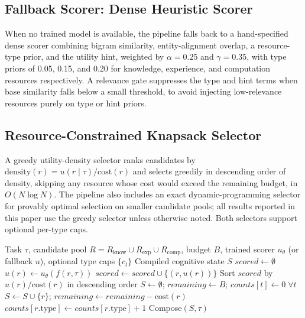 \documentclass{article}
\begin{document}
\subsection{Fallback Scorer: Dense Heuristic Scorer}

When no trained model is available, the pipeline falls back to a hand-specified dense scorer combining bigram similarity, entity-alignment overlap, a resource-type prior, and the utility hint, weighted by $\alpha = 0.25$ and $\gamma = 0.35$, with type priors of 0.05, 0.15, and 0.20 for knowledge, experience, and computation resources respectively. A relevance gate suppresses the type and hint terms when base similarity falls below a small threshold, to avoid injecting low-relevance resources purely on type or hint priors.

\subsection{Resource-Constrained Knapsack Selector}

A greedy utility-density selector ranks candidates by $\text{density}(r) = u(r \mid \tau) / \text{cost}(r)$ and selects greedily in descending order of density, skipping any resource whose cost would exceed the remaining budget, in $O(N \log N)$. The pipeline also includes an exact dynamic-programming selector for provably optimal selection on smaller candidate pools; all results reported in this paper use the greedy selector unless otherwise noted. Both selectors support optional per-type caps.

\begin{algorithm}[t]
\caption{Cognitive State Compilation}
\begin{algorithmic}[1]
\Require Task $\tau$, candidate pool $R = R_{\text{know}} \cup R_{\text{exp}} \cup R_{\text{comp}}$, budget $B$, trained scorer $u_\theta$ (or fallback $u$), optional type caps $\{c_t\}$
\Ensure Compiled cognitive state $S$
\State $scored \gets \emptyset$
  \State $u(r) \gets u_\theta(f(r, \tau))$
  \State $scored \gets scored \cup \{(r, u(r))\}$
\EndFor
\State Sort $scored$ by $u(r)/\text{cost}(r)$ in descending order
\State $S \gets \emptyset$; $remaining \gets B$; $counts[t] \gets 0 \; \forall t$
    \State $S \gets S \cup \{r\}$; $remaining \gets remaining - \text{cost}(r)$
    \State $counts[r.\text{type}] \gets counts[r.\text{type}] + 1$
  \EndIf
\EndFor
\State \Return Compose$(S, \tau)$
\end{algorithmic}
\end{algorithm}
\end{document}
